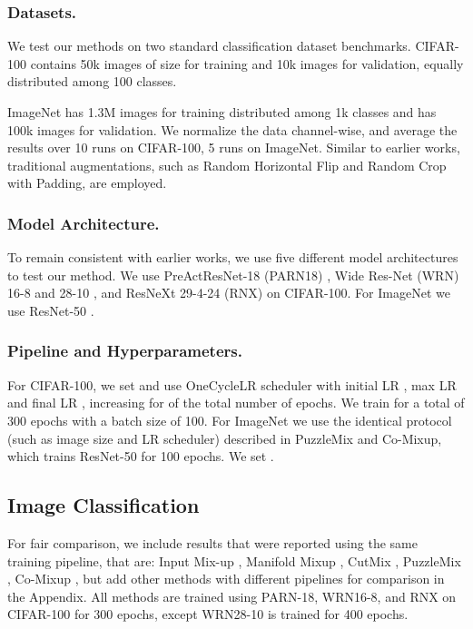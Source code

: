 \documentclass[letterpaper]{article} \usepackage[submission]{aaai23}  \usepackage{times}  \usepackage{helvet}  \usepackage{courier}  \usepackage[hyphens]{url}  \usepackage{graphicx} \urlstyle{rm} \def\UrlFont{\rm}  \usepackage{natbib}  \usepackage{caption} \frenchspacing  \setlength{\pdfpagewidth}{8.5in} \setlength{\pdfpageheight}{11in}
\newcommand{\mixup}{Input Mix-up}
\newcommand{\cutmix}{{CutMix}}
\newcommand{\puzzlemix}{{PuzzleMix}}
\newcommand{\comixup}{{Co-Mixup}}
\newcommand{\manifoldmixup}{{Manifold Mixup}}
\newcommand{\cifar}{CIFAR-100}
\newcommand{\imagenet}{ImageNet}
\begin{document}
\subsubsection{Datasets.} We test our methods on two standard classification dataset benchmarks. \cifar{} \cite{Krizhevsky09cifar100} contains 50k images of size  for training and 10k images for validation, equally distributed among 100 classes.

\imagenet{} \cite{Russakovski2015ImageNet} has 1.3M images for training distributed among 1k classes and has 100k images for validation. We normalize the data channel-wise, and average the results over 10 runs on \cifar{}, 5 runs on \imagenet{}. Similar to earlier works, traditional augmentations, such as Random Horizontal Flip and Random Crop with Padding, are employed. 

\subsubsection{Model Architecture.} To remain consistent with earlier works, we use five different model architectures to test our method. We use PreActResNet-18 (PARN18) \cite{he2016preact}, Wide Res-Net (WRN) 16-8 and 28-10 \cite{zagoruyko2017widern}, and ResNeXt 29-4-24 (RNX) \cite{xie2016resnext} on \cifar{}. For \imagenet{} we use ResNet-50 \cite{he2016resnet}.


\subsubsection{Pipeline and Hyperparameters.}
For \cifar{}, we set  and use OneCycleLR scheduler with initial LR , max LR  and final LR , increasing for  of the total number of epochs. We train for a total of 300 epochs with a batch size of 100. For \imagenet{} we use the identical protocol (such as image size and LR scheduler) described in \puzzlemix{} and \comixup{}, which trains ResNet-50 for 100 epochs. We set .


\subsection{Image Classification}
For fair comparison, we include results that were reported using the same training pipeline, that are: \mixup{} \cite{zhang2018mixup}, \manifoldmixup{} \cite{verma2019manifold}, \cutmix{} \cite{yun2019cutmix}, \puzzlemix{} \cite{kim2020puzzlemix}, \comixup{} \cite{kim2021comixup}, but add other methods with different pipelines for comparison in the Appendix. All methods are trained using PARN-18, WRN16-8, and RNX on \cifar{} for 300 epochs, except WRN28-10 is trained for 400 epochs.
\end{document}
